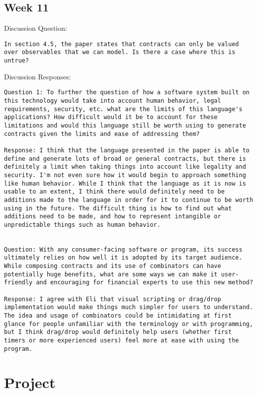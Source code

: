 \documentclass{article}
\theoremstyle{theorem}
\theoremstyle{definition}
\theoremstyle{remark}
\begin{document}
\subsection{Week 11}
Discussion Question:
\begin{lstlisting}
In section 4.5, the paper states that contracts can only be valued over observables that we can model. Is there a case where this is untrue? 
\end{lstlisting}

Discussion Responses:
\begin{lstlisting}
Question 1: To further the question of how a software system built on this technology would take into account human behavior, legal requirements, security, etc. what are the limits of this language's applications? How difficult would it be to account for these limitations and would this language still be worth using to generate contracts given the limits and ease of addressing them?

Response: I think that the language presented in the paper is able to define and generate lots of broad or general contracts, but there is definitely a limit when taking things into account like legality and security. I'm not even sure how it would begin to approach something like human behavior. While I think that the language as it is now is usable to an extent, I think there would definitely need to be additions made to the language in order for it to continue to be worth using in the future. The difficult thing is how to find out what additions need to be made, and how to represent intangible or unpredictable things such as human behavior.


Question: With any consumer-facing software or program, its success ultimately relies on how well it is adopted by its target audience. While composing contracts and its use of combinators can have potentially huge benefits, what are some ways we can make it user-friendly and encouraging for financial experts to use this new method?

Response: I agree with Eli that visual scripting or drag/drop implementation would make things much simpler for users to understand. The idea and usage of combinators could be intimidating at first glance for people unfamiliar with the terminology or with programming, but I think drag/drop would definitely help users (whether first timers or more experienced users) feel more at ease with using the program.
\end{lstlisting}

\section{Project}
\end{document}
